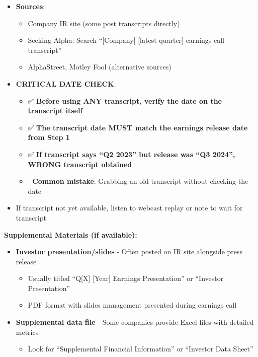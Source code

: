 \documentclass[11pt]{article}
\begin{document}
\begin{itemize}[leftmargin=*,itemsep=2pt,topsep=2pt]
\begin{itemize}[leftmargin=*,itemsep=2pt,topsep=2pt]
\item {} \textbf{Sources}:
\begin{itemize}[leftmargin=*,itemsep=2pt,topsep=2pt]
\item {} Company IR site (some post transcripts directly)
\item {} Seeking Alpha: Search ``[Company] [latest quarter] earnings call transcript''
\item {} AlphaStreet, Motley Fool (alternative sources)
\end{itemize}
\item {} \textbf{CRITICAL DATE CHECK}:
\begin{itemize}[leftmargin=*,itemsep=2pt,topsep=2pt]
\item {} ✅ \textbf{Before using ANY transcript, verify the date on the transcript itself}
\item {} ✅ \textbf{The transcript date MUST match the earnings release date from Step 1}
\item {} ✅ \textbf{If transcript says ``Q2 2023'' but release was ``Q3 2024'', WRONG transcript obtained}
\item {} 🚨 \textbf{Common mistake}: Grabbing an old transcript without checking the date
\end{itemize}
\item {} If transcript not yet available, listen to webcast replay or note to wait for transcript
\end{itemize}
\end{itemize}

\textbf{Supplemental Materials (if available):}

\begin{itemize}[leftmargin=*,itemsep=2pt,topsep=2pt]
\item {} \textbf{Investor presentation/slides} - Often posted on IR site alongside press release
\begin{itemize}[leftmargin=*,itemsep=2pt,topsep=2pt]
\item {} Usually titled ``Q[X] [Year] Earnings Presentation'' or ``Investor Presentation''
\item {} PDF format with slides management presented during earnings call
\end{itemize}
\item {} \textbf{Supplemental data file} - Some companies provide Excel files with detailed metrics
\begin{itemize}[leftmargin=*,itemsep=2pt,topsep=2pt]
\item {} Look for ``Supplemental Financial Information'' or ``Investor Data Sheet''
\end{itemize}
\end{itemize}
\end{document}
